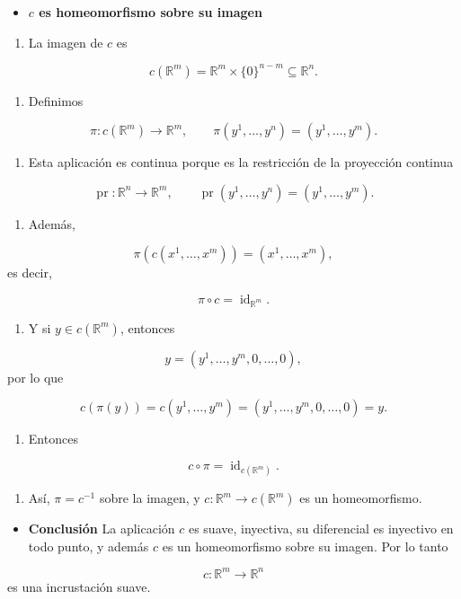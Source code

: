 \begin{bookproof}{}
\begin{itemize}
\item \textbf{$c$ es homeomorfismo sobre su imagen}
\end{itemize}
\begin{enumerate}
\item La imagen de $c$ es
\end{enumerate}
\[
c(\mathbb R^m)=\mathbb R^m\times\{0\}^{n-m}\subseteq\mathbb R^n.
\]
\begin{enumerate}[start=2]
\item Definimos
\end{enumerate}
\[
\pi:c(\mathbb R^m)\to\mathbb R^m,\qquad \pi(y^1,\dots,y^n)=(y^1,\dots,y^m).
\]
\begin{enumerate}[start=3]
\item Esta aplicación es continua porque es la restricción de la proyección continua
\end{enumerate}
\[
\operatorname{pr}:\mathbb R^n\to\mathbb R^m,\qquad \operatorname{pr}(y^1,\dots,y^n)=(y^1,\dots,y^m).
\]
\begin{enumerate}[start=4]
\item Además,
\end{enumerate}
\[
\pi(c(x^1,\dots,x^m))=(x^1,\dots,x^m),
\]
es decir,

\[
\pi\circ c=\operatorname{id}_{\mathbb R^m}.
\]
\begin{enumerate}[start=5]
\item Y si $y\in c(\mathbb R^m)$, entonces
\end{enumerate}
\[
y=(y^1,\dots,y^m,0,\dots,0),
\]
por lo que

\[
c(\pi(y))=c(y^1,\dots,y^m)=(y^1,\dots,y^m,0,\dots,0)=y.
\]
\begin{enumerate}[start=6]
\item Entonces
\end{enumerate}
\[
c\circ\pi=\operatorname{id}_{c(\mathbb R^m)}.
\]
\begin{enumerate}[start=7]
\item Así, $\pi=c^{-1}$ sobre la imagen, y $c:\mathbb R^m\to c(\mathbb R^m)$ es un homeomorfismo.
\end{enumerate}
\begin{itemize}
\item \textbf{Conclusión} La aplicación $c$ es suave, inyectiva, su diferencial es inyectivo en todo punto, y además $c$ es un homeomorfismo sobre su imagen. Por lo tanto
\end{itemize}
\[
c:\mathbb R^m\to\mathbb R^n
\]
es una incrustación suave.

\bookqed
\end{bookproof}
